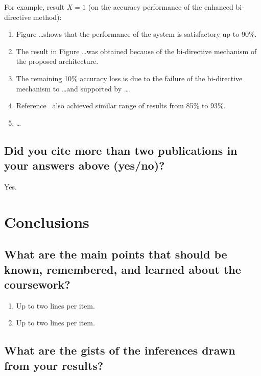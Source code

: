 For example, result $X = 1$ (on the accuracy performance of the enhanced bi-directive method):

\begin{enumerate}
\item Figure \ldots shows that the performance of the system is satisfactory up to 90\%.
\item The result in Figure \ldots was obtained because of the bi-directive mechanism of the proposed architecture.
\item The remaining 10\% accuracy loss is due to the failure of the bi-directive mechanism to \ldots and supported by \ldots.
\item Reference~\cite{Einstein1905} also achieved similar range of results from 85\% to 93\%.
\item \ldots
\end{enumerate}
	
\subsection{Did you cite more than two publications in your answers above (yes/no)?}
Yes.	



















\section{Conclusions}
\label{sec:conc}

\subsection{What are the main points that should be known, remembered, and learned about the coursework?}
\begin{enumerate}
\item Up to two lines per item.
\item Up to two lines per item.
\end{enumerate}

\subsection{What are the gists of the inferences drawn from your results?}

